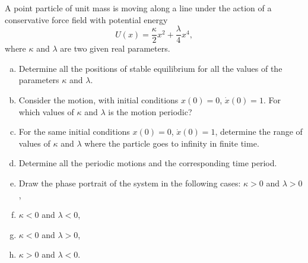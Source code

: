 \documentclass[12pt]{article}
\newenvironment{problem}[2][Problem]{\begin{trivlist}
\item[\hskip \labelsep {\bfseries #1}\hskip \labelsep {\bfseries #2.}]}{\end{trivlist}}
\begin{document}
\begin{problem}{3}
A point particle of unit mass is moving along a line under the action of a conservative force field with potential energy
\begin{equation}
U(x)=\frac{\kappa}{2} x^2+\frac{\lambda}{4}x^4,
\end{equation}
where $\kappa$ and $\lambda$ are two given real parameters.
\begin{enumerate}[(a)]
\item Determine  all the positions of stable equilibrium for all the values of the parameters $\kappa$ and $\lambda$.
\item Consider the motion, with initial conditions $x(0) = 0$, $\dot{x}(0) = 1$. For which values of $\kappa$ and $\lambda$ is the motion periodic? 
\item For the same initial conditions $x(0) = 0$, $\dot{x}(0) = 1$, determine the range of values of $\kappa$ and $\lambda$ where the particle goes to infinity in finite time.
\item Determine all the periodic motions and the corresponding time period.
\item Draw the phase portrait of the system in the following cases: $\kappa>0$ and $\lambda>0$,
\item $\kappa<0$ and $\lambda<0$,
\item $\kappa<0$ and $\lambda>0$,
\item $\kappa>0$ and $\lambda<0$.
\end{enumerate}
\end{problem}
\newpage


 
\end{document}
